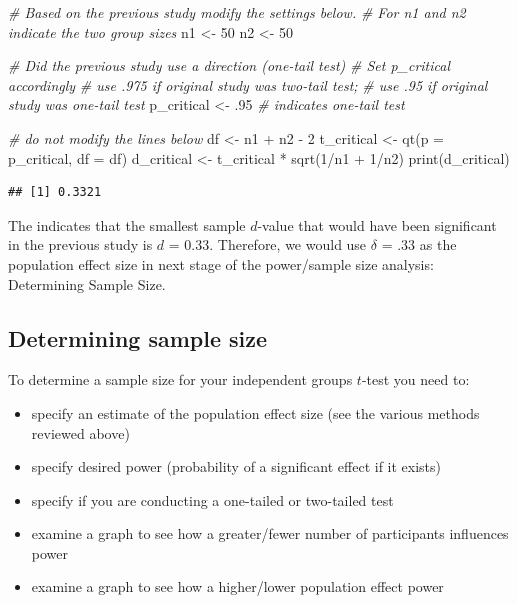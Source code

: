 \documentclass[
]{krantz}
\makeatletter
\newenvironment{Shaded}{\begin{snugshade}}{\end{snugshade}}
\newcommand{\AttributeTok}[1]{\textcolor[rgb]{0.61,0.61,0.61}{#1}}
\newcommand{\CommentTok}[1]{\textcolor[rgb]{0.37,0.37,0.37}{\textit{#1}}}
\newcommand{\DecValTok}[1]{\textcolor[rgb]{0.06,0.06,0.06}{#1}}
\newcommand{\FunctionTok}[1]{\textcolor[rgb]{0,0,0}{#1}}
\newcommand{\NormalTok}[1]{#1}
\newcommand{\OtherTok}[1]{\textcolor[rgb]{0.37,0.37,0.37}{#1}}
\newcommand{\SpecialCharTok}[1]{\textcolor[rgb]{0,0,0}{#1}}
\newenvironment{kframe}{%
\medskip{}
\setlength{\fboxsep}{.8em}
 \def\at@end@of@kframe{}%
 \ifinner\ifhmode%
  \def\at@end@of@kframe{\end{minipage}}%
  \begin{minipage}{\columnwidth}%
 \fi\fi%
 \def\FrameCommand##1{\hskip\@totalleftmargin \hskip-\fboxsep
 \colorbox{shadecolor}{##1}\hskip-\fboxsep
     \hskip-\linewidth \hskip-\@totalleftmargin \hskip\columnwidth}%
 \MakeFramed {\advance\hsize-\width
   \@totalleftmargin\z@ \linewidth\hsize
   \@setminipage}}%
 {\par\unskip\endMakeFramed%
 \at@end@of@kframe}
\renewenvironment{Shaded}{\begin{kframe}}{\end{kframe}}
\makeatother
\begin{document}
\begin{Shaded}
\begin{Highlighting}[]
\CommentTok{\# Based on the previous study modify the settings below.}
\CommentTok{\# For n1 and n2 indicate the two group sizes}
\NormalTok{n1 }\OtherTok{\textless{}{-}} \DecValTok{50}
\NormalTok{n2 }\OtherTok{\textless{}{-}} \DecValTok{50}

\CommentTok{\# Did the previous study use a direction (one{-}tail test)}
\CommentTok{\# Set p\_critical accordingly}
\CommentTok{\# use .975 if original study was two{-}tail test;}
\CommentTok{\# use .95 if original study was one{-}tail test}
\NormalTok{p\_critical }\OtherTok{\textless{}{-}}\NormalTok{ .}\DecValTok{95} \CommentTok{\# indicates one{-}tail test}

\CommentTok{\# do not modify the lines below}
\NormalTok{df }\OtherTok{\textless{}{-}}\NormalTok{ n1 }\SpecialCharTok{+}\NormalTok{ n2 }\SpecialCharTok{{-}} \DecValTok{2}
\NormalTok{t\_critical }\OtherTok{\textless{}{-}} \FunctionTok{qt}\NormalTok{(}\AttributeTok{p =}\NormalTok{ p\_critical, }\AttributeTok{df =}\NormalTok{ df) }
\NormalTok{d\_critical }\OtherTok{\textless{}{-}}\NormalTok{ t\_critical }\SpecialCharTok{*} \FunctionTok{sqrt}\NormalTok{(}\DecValTok{1}\SpecialCharTok{/}\NormalTok{n1 }\SpecialCharTok{+} \DecValTok{1}\SpecialCharTok{/}\NormalTok{n2)}
\FunctionTok{print}\NormalTok{(d\_critical)}
\end{Highlighting}
\end{Shaded}

\begin{verbatim}
## [1] 0.3321
\end{verbatim}

The indicates that the smallest sample \(d\)-value that would have been significant in the previous study is \(d\) = 0.33. Therefore, we would use \(\delta\) = .33 as the population effect size in next stage of the power/sample size analysis: Determining Sample Size.

\hypertarget{determining-sample-size}{%
\subsection{Determining sample size}\label{determining-sample-size}}

To determine a sample size for your independent groups \(t\)-test you need to:

\begin{itemize}
\item
  specify an estimate of the population effect size (see the various methods reviewed above)
\item
  specify desired power (probability of a significant effect if it exists)
\item
  specify if you are conducting a one-tailed or two-tailed test
\item
  examine a graph to see how a greater/fewer number of participants influences power
\item
  examine a graph to see how a higher/lower population effect power
\end{itemize}
\end{document}
